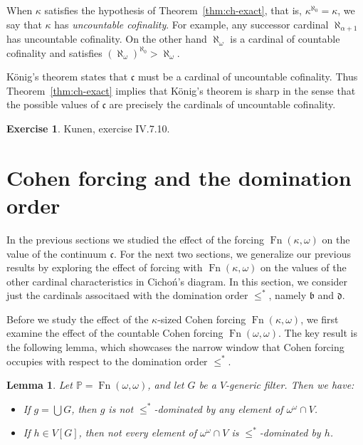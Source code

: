 \documentclass[11pt,oneside,a4paper]{amsbook}
\newcommand{\PP}{\mathbb P}
\DeclareMathOperator{\Fn}{Fn}
\theoremstyle{definition}
\newtheorem{exercise}{Exercise}[section]
\theoremstyle{plain}
\newtheorem{lemma}[theorem]{Lemma}
\theoremstyle{definition}
\theoremstyle{remark}
\numberwithin{equation}{section}
\numberwithin{figure}{section}
\begin{document}
When $\kappa$ satisfies the hypothesis of Theorem~\ref{thm:ch-exact}, that is, $\kappa^{\aleph_0}=\kappa$, we say that $\kappa$ has \emph{uncountable cofinality}. For example, any successor cardinal $\aleph_{\alpha+1}$ has uncountable cofinality. On the other hand $\aleph_\omega$ is a cardinal of countable cofinality and satisfies $(\aleph_\omega)^{\aleph_0}>\aleph_\omega$.

K\"onig's theorem states that $\mathfrak c$ must be a cardinal of uncountable cofinality. Thus Theorem~\ref{thm:ch-exact} implies that K\"onig's theorem is sharp in the sense that the possible values of $\mathfrak c$ are precisely the cardinals of uncountable cofinality.

\begin{exercise}
  Kunen, exercise IV.7.10.
\end{exercise}


\newpage
\section{Cohen forcing and the domination order}

In the previous sections we studied the effect of the forcing $\Fn(\kappa,\omega)$ on the value of the continuum $\mathfrak c$. For the next two sections, we generalize our previous results by exploring the effect of forcing with $\Fn(\kappa,\omega)$ on the values of the other cardinal characteristics in Cicho\'n's diagram. In this section, we consider just the cardinals associtaed with the domination order $\leq^*$, namely $\mathfrak b$ and $\mathfrak d$.

Before we study the effect of the $\kappa$-sized Cohen forcing $\Fn(\kappa,\omega)$, we first examine the effect of the countable Cohen forcing $\Fn(\omega,\omega)$. The key result is the following lemma, which showcases the narrow window that Cohen forcing occupies with respect to the domination order $\leq^*$.

\begin{lemma}
  \label{lem:cohen-dominating}
  Let $\PP=\Fn(\omega,\omega)$, and let $G$ be a $V$-generic filter. Then we have:
  \begin{itemize}
  \item If $g=\bigcup G$, then $g$ is not $\leq^*$-dominated by any element of $\omega^\omega\cap V$.
  \item If $h\in V[G]$, then not every element of $\omega^\omega\cap V$ is $\leq^*$-dominated by $h$.
  \end{itemize}
\end{lemma}
\end{document}
